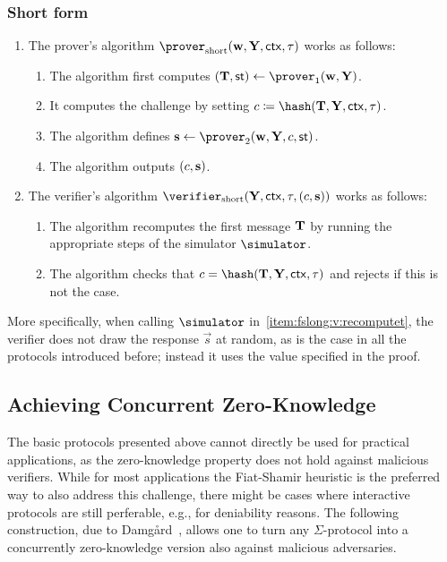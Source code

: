 \documentclass[runningheads]{llncs}
\begin{document}
\subsubsection{Short form}
\begin{enumerate}
  \item
    The prover's algorithm $\shortprover(\vec \witness, \vec \statement,\ctx, \stag)$ works as follows:
    \begin{enumerate}
      \item
        The algorithm first computes $(\vec \commitment,\st)\gets\prover_1(\vec \witness, \vec \statement)$.
      \item
        It computes the challenge by setting $c\defeq\hash(\vec \commitment, \vec \statement,\ctx, \stag)$.
      \item
        The algorithm defines $\vec \response\gets\prover_2(\vec \witness,\vec \statement, \challenge,\st)$.
      \item
        The algorithm outputs $(c,\mathbf {s})$.
    \end{enumerate}
  \item
    The verifier's algorithm $\shortverifier(\vec \statement, \ctx, \stag, (\challenge, \vec \response))$ works as follows:
    \begin{enumerate}
      \item\label{item:fslong:v:recomputet}
        The algorithm recomputes the first message $\mathbf {T}$ by running the appropriate steps of the simulator $\simulator$.
        \item
        The algorithm checks that $c=\hash(\vec \commitment, \vec \statement, \ctx, \tau)$ and rejects if this is not the case.
    \end{enumerate}
\end{enumerate}


More specifically, when calling $\simulator$ in~\cref{item:fslong:v:recomputet}, the verifier does not draw the response $\vec s$ at random, as is the case in all the protocols introduced before;
instead it uses the value specified in the proof.


\subsection{Achieving Concurrent Zero-Knowledge}\label{sec:concurrent}
The basic protocols presented above cannot directly be used for practical applications, as the zero-knowledge property does not hold against malicious verifiers.
While for most applications the Fiat-Shamir heuristic is the preferred way to also address this challenge, there might be cases where interactive protocols are still perferable, e.g., for deniability reasons.
The following construction, due to Damg\r{a}rd~\cite{EC:Damgard00}, allows one to turn any $\Sigma$-protocol into a concurrently zero-knowledge version also against malicious adversaries.
\end{document}
